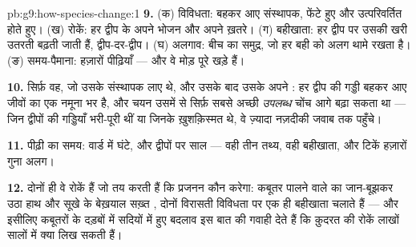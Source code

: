 \begin{solution}{pb:g9:how-species-change:1}
\textbf{9.} (क) विविधता: बहकर आए संस्थापक, फेंटे हुए और उत्परिवर्तित
होते हुए। (ख) रोकें: हर द्वीप के अपने भोजन और अपने ख़तरे। (ग) बहीखाता:
हर द्वीप पर उसकी खरी उतरती  बढ़ती जाती हैं, द्वीप-दर-द्वीप।
(घ) अलगाव: बीच का समुद्र, जो हर बही को अलग थामे रखता है। (ङ)
समय-पैमाना: हज़ारों पीढ़ियाँ --- और वे मोड़ पूरे खड़े हैं।

\textbf{10.} सिर्फ़ वह, जो उसके संस्थापक लाए थे, और उसके बाद उसके अपने
: हर द्वीप की गड्डी बहकर आए जीवों का एक नमूना भर है, और चयन
उसमें से सिर्फ़ सबसे अच्छी \emph{उपलब्ध} चोंच आगे बढ़ा सकता था ---
जिन द्वीपों की गड्डियाँ भरी-पूरी थीं या जिनके  ख़ुशक़िस्मत थे,
वे ज़्यादा नज़दीकी जवाब तक पहुँचे।

\textbf{11.} पीढ़ी का समय: वार्ड में घंटे, और द्वीपों पर साल --- वही तीन
तथ्य, वही बहीखाता, और टिकें हज़ारों गुना अलग।

\textbf{12.} दोनों ही वे रोकें हैं जो तय करती हैं कि प्रजनन कौन करेगा:
कबूतर पालने वाले का जान-बूझकर उठा हाथ और सूखे के बेख़याल सख़्त ,
दोनों विरासती विविधता पर एक ही बहीखाता चलाते हैं --- और इसीलिए कबूतरों
के दड़बों में सदियों में हुए बदलाव इस बात की गवाही देते हैं कि क़ुदरत की
रोकें लाखों सालों में क्या लिख सकती हैं।
\end{solution}
